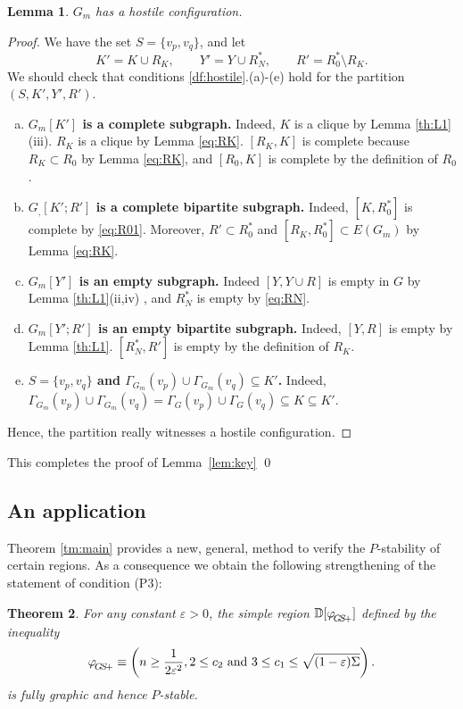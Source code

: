 \documentclass[11pt]{elsarticle}
\theoremstyle{plain}
\newtheorem{theorem}{Theorem}[section]
\newtheorem{lemma}[theorem]{Lemma}
\theoremstyle{definition}
\def\ds{\rule{0pt}{1.5ex}}
\newcommand{\ep}{\varepsilon}
\begin{document}
\begin{lemma}\label{lm:dream-2}
$G_m$ has a hostile configuration.
\end{lemma}
\begin{proof}
We have the  set $S=\{v_p,v_q\}$, and let
    \begin{displaymath}
    K'=K\cup R_K,\qquad
     Y'=Y\cup R^*_N, \qquad
     R'=R^*_0\setminus R_K.
    \end{displaymath}
We should check that conditions \ref{df:hostile}.(a)-(e)  hold for the partition     $(S,K',Y',R')$.

\begin{enumerate}[(a)]
\item {\bf $G_m[K']$  is a complete subgraph.} \quad
    Indeed, $K$ is a clique by Lemma \ref{th:L1}(iii). $R_K$ is a clique by Lemma \ref{eq:RK}. $[R_K,K]$ is complete because $R_K\subset R_0$ by Lemma \ref{eq:RK}, and $[R_0,K]$ is complete by the definition of $R_0$.
\item  {\bf $G_,[K';R']$ is a complete bipartite subgraph.} \quad
    Indeed, $[K,R^*_0]$ is complete by \eqref{eq:R01}.  Moreover, $R'\subset R_0^*$ and  $[R_K,R_0^*]\subset E(G_m)$ by Lemma \ref{eq:RK}.
\item  {\bf $G_m[Y']$ is an empty subgraph.} \quad  Indeed $[Y,Y\cup R]$ is empty in $G$
by Lemma  \ref{th:L1}(ii,iv) , and $R^*_N$ is empty by \eqref{eq:RN}.
\item {\bf $G_m[Y';R']$ is an empty bipartite subgraph.} \quad
    Indeed, $[Y,R]$ is empty by Lemma \ref{th:L1}. $[R_N^*,R']$ is empty by the definition of $R_K$.
\item {\bf  $S=\{v_p,v_q\}$ and  $\Gamma_{G_m}(v_p)\cup \Gamma_{G_m }(v_q) \subseteq K'$.} \quad
    Indeed, $\Gamma_{G_m}(v_p)\cup \Gamma_{G_m }(v_q)= \Gamma_{G}(v_p)\cup \Gamma_{G}(v_q) \subseteq K\subseteq K'$.
\end{enumerate}
Hence, the partition really witnesses a hostile configuration.
\end{proof}
This completes the proof of Lemma~\ref{lem:key} \qed

\subsection{An application}\label{sec:apply}

Theorem \ref{tm:main} provides a new, general, method to verify the $P$-stability of certain regions. As a consequence we obtain the following strengthening of the statement of condition (P3):
\begin{theorem}\label{th:SF+}
For any constant $ \varepsilon>0 $, the simple region $\mathbb D[{\varphi}_{\ds \! {G\!S\!+}}]$ defined by the inequality
$$
\varphi_{\ds \!{G\!S\!+}} \equiv \left (n \geq \frac{1}{2\ep^2}, 2\le c_2 \text{ and } 3 \le c_1 \le \sqrt{(1-\varepsilon)\Sigma}\right).
$$
is fully graphic and hence $P$-stable.
\end{theorem}
\end{document}
